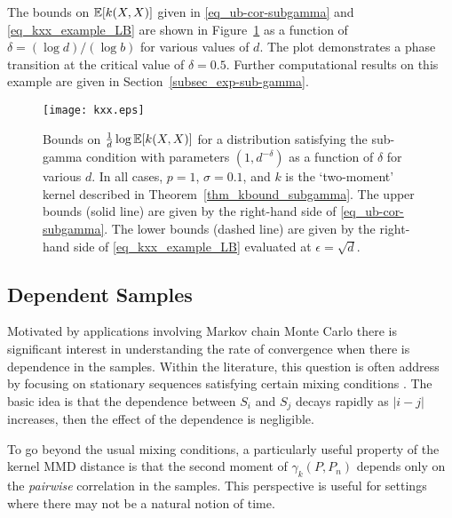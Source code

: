 \documentclass{article}
\theoremstyle{definition}
\newcommand{\ex}[1]{\ensuremath{\mathbb{E}\left[ #1\right]}}
\newcommand{\eps}{\epsilon}
\newcommand{\red}{\color{red}}
\newcommand{\nbr}[1]{{\red[#1]}}
\let\originalleft\left
\let\originalright\right
\renewcommand{\left}{\mathopen{}\mathclose\bgroup\originalleft}
\renewcommand{\right}{\aftergroup\egroup\originalright}
\begin{document}
The bounds on $\ex{k(X,X)}$ given in \eqref{eq_ub-cor-subgamma} and \eqref{eq_kxx_example_LB} are shown in Figure~\ref{fig_kxx} as a function of $\delta = (\log d)/(\log b)$ for various values of $d$. The plot demonstrates a phase transition at the critical value of $\delta = 0.5$.
Further computational results on this example are given in Section~\ref{subsec_exp-sub-gamma}.


\begin{figure*}
\centering
  \texttt{[image: kxx.eps]}
  \caption{\label{fig_kxx}
  \small 
  Bounds on $\frac{1}{d} \log \ex{ k(X,X)}$ for a distribution satisfying the sub-gamma condition with parameters $(1,d^{-\delta})$ as a function of $\delta$ for various $d$.  In all cases, $p=1$, $\sigma = 0.1$, and $k$ is the `two-moment' kernel described in Theorem~\ref{thm_kbound_subgamma}.  The upper bounds (solid line) are given by the right-hand side of \eqref{eq_ub-cor-subgamma}. The lower bounds (dashed line) are given by the right-hand side of \eqref{eq_kxx_example_LB} evaluated at $\eps = \sqrt{d}$. %
  }
\end{figure*}


\subsection{Dependent Samples}\label{sec:dependent_samples}

Motivated by applications involving Markov chain Monte Carlo there is significant interest in understanding the rate of convergence when there is dependence in the samples. Within the literature, this question is often address by focusing on stationary sequences satisfying certain mixing conditions \cite{peligrad1986recent}. The basic idea is that the dependence between $S_i$ and $S_j$  decays rapidly as $|i -j|$ increases, then the effect of the dependence is negligible. 

To go beyond the usual mixing conditions, a particularly useful property of the kernel MMD distance is that the second moment of $\gamma_k(P,P_n)$  depends only on the \emph{pairwise} correlation in the samples. This perspective is useful for settings where there may not be a natural notion of time. 
\end{document}
